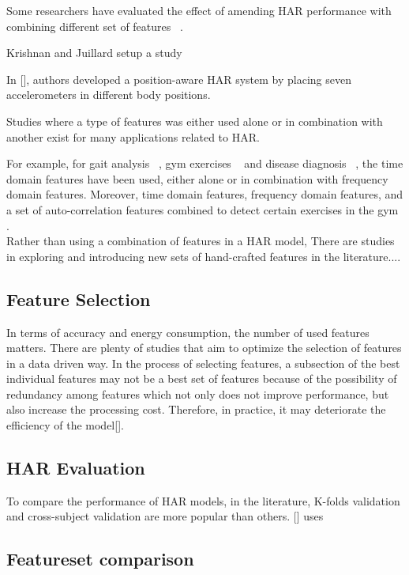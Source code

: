 \documentclass[journal,article,submit,moreauthors,pdftex]{Definitions/mdpi}
\begin{document}
Some researchers have evaluated the effect of amending HAR performance with combining different set of features  ~\cite{yazdansepas2016multi, chen2018distilling}.


    Krishnan and Juillard setup a study \cite{krishnan2009recognition}

In [], authors developed a position-aware HAR system by placing seven accelerometers in different body positions.




Studies where a type of features was either used alone or in combination with another exist for many applications related to HAR.

For example, for gait analysis ~\cite{zhang2011feature, sprager2015inertial}, gym exercises ~\cite{rosati2018comparison} and disease diagnosis ~\cite{janidarmian2014automated}, the time domain features have been used, either alone or in combination with frequency domain features. Moreover, time domain features, frequency domain features, and a set of auto-correlation features combined to detect certain exercises in the gym \cite{morris2014recofit, rosati2018comparison}. \\
 

Rather than using a combination of features in a HAR model, There are studies in exploring and introducing new sets of hand-crafted features in the literature....

\subsection{Feature Selection}
In terms of accuracy and energy consumption, the number of used features matters. There are plenty of studies that aim to optimize the selection of features in a data driven way. In the process of selecting features, a subsection of the best individual features may not be a best set of features because of the possibility of redundancy among features which not only does not improve performance, but also increase the processing cost. Therefore, in practice, it may deteriorate the efficiency of the model[].%
\subsection{HAR Evaluation}
To compare the performance of HAR models, in the literature, K-folds validation and cross-subject validation are more popular than others. [] uses 

\subsection{Featureset comparison}
\end{document}
